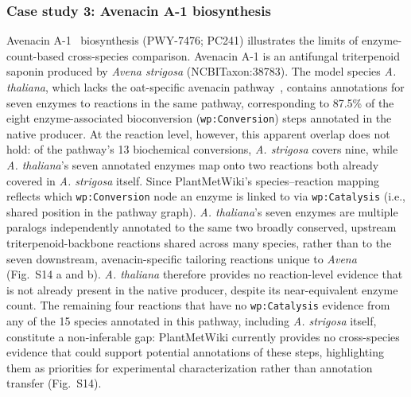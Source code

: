 \documentclass[11pt,a4paper]{article}
\begin{document}
\subsubsection*{Case study 3: Avenacin A-1 biosynthesis}
\vspace*{-1em}
Avenacin A-1~\cite{leveau2019} biosynthesis (PWY-7476; PC241) illustrates the limits of
enzyme-count-based cross-species comparison. Avenacin A-1 is an antifungal triterpenoid saponin
produced by \textit{Avena strigosa} (NCBITaxon:38783). The model species \textit{A. thaliana}, which lacks the
oat-specific avenacin pathway~\cite{li2021}, contains annotations for seven enzymes to reactions in the
same pathway, corresponding to 87.5\% of the eight enzyme-associated bioconversion
(\texttt{wp:Conversion}) steps annotated in the native producer. At the reaction level, however, this
apparent overlap does not hold: of the pathway's 13 biochemical conversions, \textit{A. strigosa}
covers nine, while \textit{A. thaliana}'s seven annotated enzymes map onto two
reactions both already covered in \textit{A. strigosa} itself. Since PlantMetWiki's
species--reaction mapping reflects which \texttt{wp:Conversion} node an enzyme is linked to via
\texttt{wp:Catalysis} (i.e., shared position in the pathway graph). \textit{A. thaliana}'s seven
enzymes are multiple paralogs independently annotated to the same two broadly conserved, upstream
triterpenoid-backbone reactions shared across many species, rather than to the seven downstream,
avenacin-specific tailoring reactions unique to \textit{Avena}~\cite{li2021} (Fig.~S14 a and b). \textit{A.
thaliana} therefore provides no reaction-level evidence that is not already present in the native
producer, despite its near-equivalent enzyme count. The remaining four reactions that have no
\texttt{wp:Catalysis} evidence from any of the 15 species annotated in this pathway, including
\textit{A. strigosa} itself, constitute a non-inferable gap: PlantMetWiki currently provides no
cross-species evidence that could support potential annotations of these steps, highlighting them as priorities
for experimental characterization rather than annotation transfer (Fig.~S14).
\end{document}
